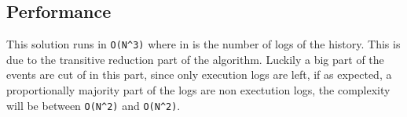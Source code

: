 \subsection{Performance} %
This solution runs in \texttt{O(N^3)} where in is the number of logs of the history. This is due to the transitive reduction part of the algorithm. Luckily a big part of the events are cut of in this part, since only execution logs are left, if as expected, a proportionally majority part of the logs are non exectution logs, the complexity will be between \texttt{O(N^2)} and \texttt{O(N^2)}.

